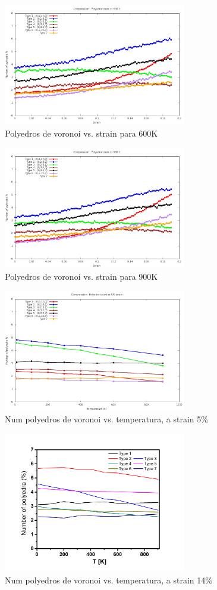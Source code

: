 \documentclass[10pt, oneside]{article} %
\begin{document}
\begin{figure}[H]
\centering
\includegraphics[width=8cm]{Figures/Compr_Polyedra_600K.jpeg}
\caption{Polyedros de voronoi vs. strain para 600K}
\end{figure}

\begin{figure}[H]
\centering
\includegraphics[width=8cm]{Figures/Compr_Polyedra_900K.jpeg}
\caption{Polyedros de voronoi vs. strain para 900K}
\end{figure}

\begin{figure}[H]
\centering
\includegraphics[width=8cm]{Figures/Compr_Voro_Temp_5.jpeg}
\caption{Num polyedros de voronoi vs. temperatura, a strain 5\%}
\end{figure}

\begin{figure}[H]
\centering
\includegraphics[width=8cm]{Figures/poly_T_14strain_COMP.png}
\caption{Num polyedros de voronoi vs. temperatura, a strain 14\%}
\end{figure}
\end{document}
